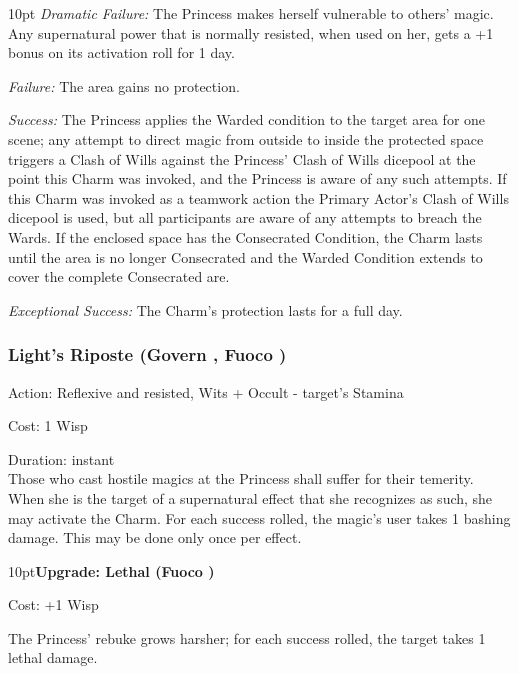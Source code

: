\begin{myindentpar}{10pt}    \emph{Dramatic Failure:} The Princess makes herself vulnerable to others' magic. Any supernatural power that is normally resisted, when used on her, gets a +1 bonus on its activation roll for 1 day.

    \emph{Failure:} The area gains no protection.

    \emph{Success:} The Princess applies the Warded condition to the target area for one scene; any attempt to direct magic from outside to inside the protected space triggers a Clash of Wills against the Princess' Clash of Wills dicepool at the point this Charm was invoked, and the Princess is aware of any such attempts. If this Charm was invoked as a teamwork action the Primary Actor's Clash of Wills dicepool is used, but all participants are aware of any attempts to breach the Wards. If the enclosed space has the Consecrated Condition, the Charm lasts until the area is no longer Consecrated and the Warded Condition extends to cover the complete Consecrated are.

    \emph{Exceptional Success:} The Charm's protection lasts for a full day.\end{myindentpar}



\subsubsection*{Light's Riposte (Govern \textbullet\textbullet, Fuoco \textbullet)}

\noindent Action: Reflexive and resisted, Wits + Occult - target's Stamina

\noindent Cost: 1 Wisp

\noindent Duration: instant\\

\noindent Those who cast hostile magics at the Princess shall suffer for their temerity. When she is the target of a supernatural effect that she recognizes as such, she may activate the Charm. For each success rolled, the magic's user takes 1 bashing damage. This may be done only once per effect. 

\begin{myindentpar}{10pt}\textbf{Upgrade: Lethal (Fuoco \textbullet\textbullet)}

\noindent Cost: +1 Wisp

The Princess' rebuke grows harsher; for each success rolled, the target takes 1 lethal damage.\end{myindentpar}


